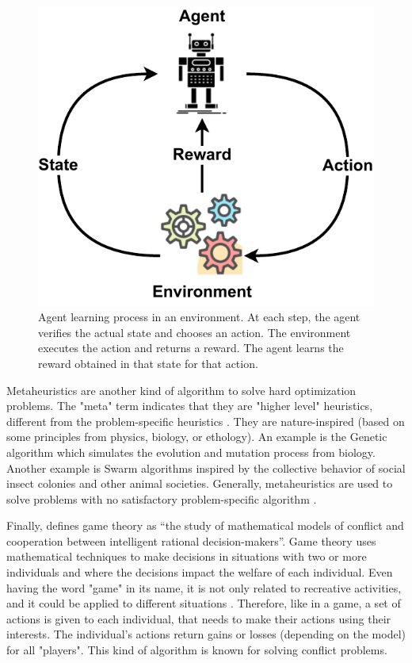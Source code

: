 \begin{figure}[!htb]
    \centering
    \includegraphics[scale=0.6]{Images/Related_works/Reinforcement_learning.pdf}
    \caption[Agent learning process in an environment]{Agent learning process in an environment. At each step, the agent verifies the actual state and chooses an action. The environment executes the action and returns a reward. The agent learns the reward obtained in that state for that action.}
    \label{fig:reinforcement}
\end{figure}

Metaheuristics are another kind of algorithm to solve hard optimization problems. The "meta" term indicates that they are "higher level" heuristics, different from the problem-specific heuristics \cite{boussaid2013survey}. They are nature-inspired (based on some principles from physics, biology, or ethology). An example is the Genetic algorithm which simulates the evolution and mutation process from biology. Another example is Swarm algorithms inspired by the collective behavior of social insect colonies and other animal societies. Generally, metaheuristics are used to solve problems with no satisfactory problem-specific algorithm \cite{boussaid2013survey}.

Finally, \citeauthor{myerson1991game} defines game theory as ``the study of mathematical models of conflict and cooperation between intelligent rational decision-makers''. Game theory uses mathematical techniques to make decisions in situations with two or more individuals and where the decisions impact the welfare of each individual. Even having the word "game" in its name, it is not only related to recreative activities, and it could be applied to different situations \cite{myerson1991game, osborne2004introduction}. Therefore, like in a game, a set of actions is given to each individual, that needs to make their actions using their interests. The individual's actions return gains or losses (depending on the model) for all "players". This kind of algorithm is known for solving conflict problems.


